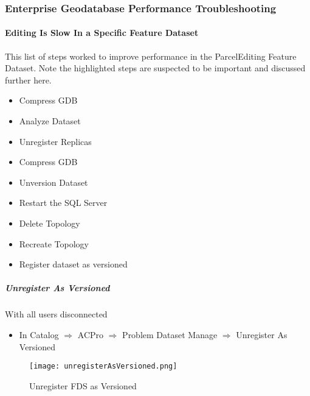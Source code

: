     
\subsubsection{Enterprise Geodatabase Performance Troubleshooting}
\paragraph[Feature Dataset Editing Performance]{Editing Is Slow In a Specific Feature Dataset{\\}{}}

This list of steps worked to improve performance in the ParcelEditing Feature Dataset.  Note the highlighted steps are suspected to be important and discussed further here.
\begin{itemize}
\item Compress GDB

\item Analyze Dataset

\item Unregister Replicas

\item Compress GDB

\item {\LARGE Unversion Dataset}

\item {\LARGE Restart the SQL Server}

\item Delete Topology

\item Recreate Topology

\item {\LARGE Register dataset as versioned}
\end{itemize}

\clearpage


\subparagraph{Unregister As Versioned}

\noindent With all users disconnected
\begin{itemize}
\item In Catalog $\Rightarrow$  ACPro $\Rightarrow$ Problem Dataset { \rtArrow} Manage $\Rightarrow$ Unregister As Versioned
\end{itemize}
\begin{figure}[h!]
\centering
    \texttt{[image: unregisterAsVersioned.png]}
\vspace*{-3mm}\caption{Unregister FDS as Versioned}

\end{figure}
\clearpage
  
